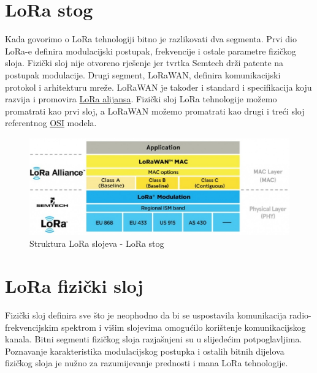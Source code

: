 \section{LoRa stog}
\label{section:lora_overview}
Kada govorimo o LoRa tehnologiji bitno je razlikovati dva segmenta. Prvi dio LoRa-e definira modulacijski postupak, frekvencije i ostale parametre fizičkog sloja. Fizički sloj nije otvoreno rješenje jer tvrtka Semtech drži patente na postupak modulacije. Drugi segment, LoRaWAN, definira komunikacijski protokol i arhitekturu mreže. LoRaWAN je također i standard i specifikacija koju razvija i promovira \href{https://lora-alliance.org/}{LoRa alijansa}. Fizički sloj LoRa tehnologije možemo promatrati kao prvi sloj, a LoRaWAN možemo promatrati kao drugi i treći sloj referentnog \href{https://en.wikipedia.org/wiki/OSI_model}{OSI} modela.

\begin{figure}[ht!]
	\centering
	\includegraphics[width=1.0\textwidth]{images/lorawan-stack.jpg}
\caption{Struktura LoRa slojeva - LoRa stog}
\label{img:lora_stack}
\end{figure}



\section{LoRa fizički sloj}
\label{section:lora_phy}
Fizički sloj definira sve što je neophodno da bi se uspostavila komunikacija radio-frekvencijskim spektrom i višim slojevima omogućilo korištenje komunikacijskog kanala. 
Bitni segmenti fizičkog sloja razjašnjeni su u slijedećim potpoglavljima. Poznavanje karakteristika modulacijskog postupka i ostalih bitnih dijelova fizičkog sloja je nužno za razumijevanje prednosti i mana LoRa tehnologije.


